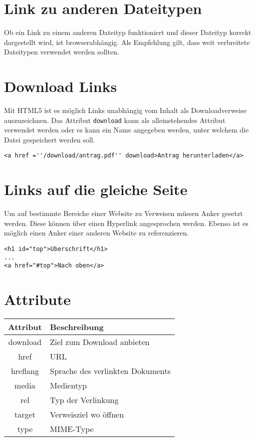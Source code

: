\section{Link zu anderen Dateitypen}
Ob ein Link zu einem anderen Dateityp funktioniert und dieser Dateityp korrekt dargestellt wird, ist browserabhängig. Als Empfehlung gilt, dass weit verbreitete Dateitypen verwendet werden sollten.
\section{Download Links}
Mit HTML5 ist es möglich Links unabhängig vom Inhalt als Downloadverweise auszuzeichnen. Das Attribut \texttt{download} kann als alleinstehendes Attribut verwendet werden oder es kann ein Name angegeben werden, unter welchem die Datei gespeichert werden soll.\\[-1.5em]
 \begin{verbatim}
<a href =''/download/antrag.pdf'' download>Antrag herunterladen</a>
\end{verbatim}
\section{Links auf die gleiche Seite}
Um auf bestimmte Bereiche einer Website zu Verweisen müssen Anker gesetzt werden. Diese können über einen Hyperlink angesprochen werden. Ebenso ist es möglich einen Anker einer anderen Website zu referenzieren.
\begin{lstlisting}[caption=''Anker'']
<h1 id="top">Uberschrift</h1>
...
<a href="#top">Nach oben</a>
\end{lstlisting}
\section{Attribute}
\begin{tabular}{|c|l|}
\hline
\rowcolor{lstback}\textbf{Attribut}	&\textbf{Beschreibung}\\
\hline
download	&Ziel zum Download anbieten\\
\hline
href 		&URL\\
\hline
hreflang	&Sprache des verlinkten Dokuments\\
\hline
media	&Medientyp\\
\hline
rel		&Typ der Verlinkung\\
\hline
target	&Verweisziel wo öffnen\\
\hline
type		&MIME-Type\\
\hline
\end{tabular}
